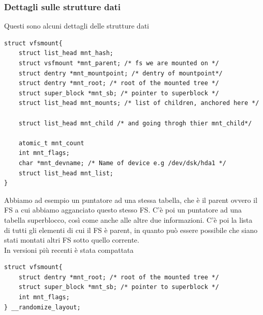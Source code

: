 \documentclass[12pt, oneside]{extbook}
\begin{document}
\subsubsection{Dettagli sulle strutture dati}
Questi sono alcuni dettagli delle strutture dati
\begin{lstlisting}
struct vfsmount{
	struct list_head mnt_hash;
	struct vsfmount *mnt_parent; /* fs we are mounted on */
	struct dentry *mnt_mountpoint; /* dentry of mountpoint*/
	struct dentry *mnt_root; /* root of the mounted tree */
	struct super_block *mnt_sb; /* pointer to superblock */
	struct list_head mnt_mounts; /* list of children, anchored here */
	
	struct list_head mnt_child /* and going throgh thier mnt_child*/
	
	atomic_t mnt_count
	int mnt_flags;
	char *mnt_devname; /* Name of device e.g /dev/dsk/hda1 */
	struct list_head mnt_list;
}
\end{lstlisting}
Abbiamo ad esempio un puntatore ad una stessa tabella, che è il parent ovvero il FS a cui abbiamo agganciato questo stesso FS. C'è poi un puntatore ad una tabella superblocco, così come anche alle altre due informazioni. C'è poi la lista di tutti gli elementi di cui il FS è parent, in quanto può essere possibile che siano stati montati altri FS sotto quello corrente.\\In versioni più recenti è stata compattata
\begin{lstlisting}
struct vfsmount{
	struct dentry *mnt_root; /* root of the mounted tree */
	struct super_block *mnt_sb; /* pointer to superblock */
	int mnt_flags;
} __randomize_layout;
\end{lstlisting}
\end{document}
